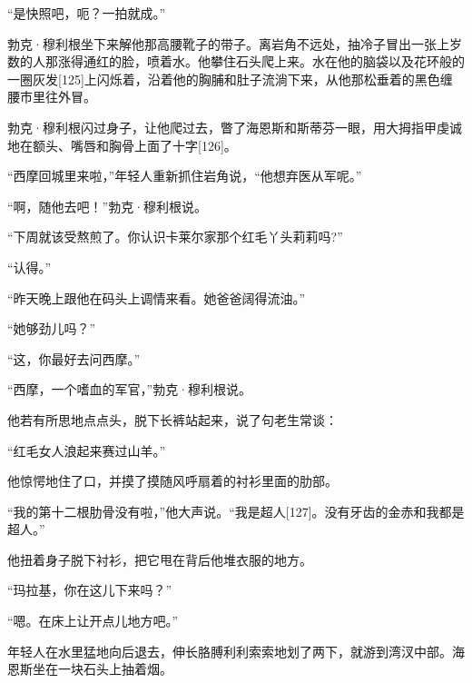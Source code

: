 \documentclass{article}
\begin{document}
“是快照吧，呃？一拍就成。”



勃克·穆利根坐下来解他那高腰靴子的带子。离岩角不远处，抽冷子冒出一张上岁数的人那涨得通红的脸，喷着水。他攀住石头爬上来。水在他的脑袋以及花环般的一圈灰发[125]上闪烁着，沿着他的胸脯和肚子流淌下来，从他那松垂着的黑色缠腰市里往外冒。



勃克·穆利根闪过身子，让他爬过去，瞥了海恩斯和斯蒂芬一眼，用大拇指甲虔诚地在额头、嘴唇和胸骨上面了十字[126]。



“西摩回城里来啦，”年轻人重新抓住岩角说，“他想弃医从军呢。”



“啊，随他去吧！”勃克·穆利根说。



“下周就该受熬煎了。你认识卡莱尔家那个红毛丫头莉莉吗?”



“认得。”



“昨天晚上跟他在码头上调情来看。她爸爸阔得流油。”



“她够劲儿吗？”



“这，你最好去问西摩。”



“西摩，一个嗜血的军官，”勃克·穆利根说。



他若有所思地点点头，脱下长裤站起来，说了句老生常谈：



“红毛女人浪起来赛过山羊。”



他惊愕地住了口，并摸了摸随风呼扇着的衬衫里面的肋部。



“我的第十二根肋骨没有啦，”他大声说。“我是超人[127]。没有牙齿的金赤和我都是超人。”



他扭着身子脱下衬衫，把它甩在背后他堆衣服的地方。



“玛拉基，你在这儿下来吗？”



“嗯。在床上让开点儿地方吧。”



年轻人在水里猛地向后退去，伸长胳膊利利索索地划了两下，就游到湾汊中部。海恩斯坐在一块石头上抽着烟。
\end{document}
